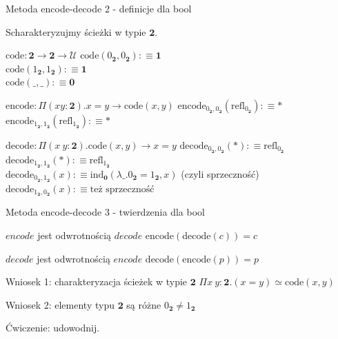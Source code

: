 \documentclass{beamer}
\newcommand{\defn}{:\equiv}
\newcommand{\U}{\mathcal{U}}
\newcommand{\refl}[1]{\text{refl}_{#1}}
\newcommand{\code}{\text{code}}
\newcommand{\encode}{\text{encode}}
\newcommand{\decode}{\text{decode}}
\begin{document}
\begin{frame}{Metoda encode-decode 2 - definicje dla bool}
	
Scharakteryzujmy ścieżki w typie $\textbf{2}$.

\begin{block}{$\code : \textbf{2} \to \textbf{2} \to \U$}
$\code(0_{\textbf{2}}, 0_{\textbf{2}}) \defn \textbf{1}$ \\
$\code(1_{\textbf{2}}, 1_{\textbf{2}}) \defn \textbf{1}$ \\
$\code(\_, \_) \defn \textbf{0}$
\end{block}

\begin{block}{$\encode : \Pi (x y : \textbf{2}). x = y \to \code(x, y)$}
$\encode_{0_{\textbf{2}}, 0_{\textbf{2}}}(\refl{0_{\textbf{2}}}) \defn *$ \\
$\encode_{1_{\textbf{2}}, 1_{\textbf{2}}}(\refl{1_{\textbf{2}}}) \defn *$
\end{block}

\begin{block}{$\decode : \Pi (x\ y : \textbf{2}). \code(x, y) \to x = y$}
$\decode_{0_{\textbf{2}}, 0_{\textbf{2}}}(*) \defn \refl{0_{\textbf{2}}}$ \\
$\decode_{1_{\textbf{2}}, 1_{\textbf{2}}}(*) \defn \refl{1_{\textbf{2}}}$ \\
$\decode_{0_{\textbf{2}}, 1_{\textbf{2}}}(x) \defn \text{ind}_{\textbf{0}}(\lambda \_. 0_{\textbf{2}} = 1_{\textbf{2}}, x)$ (czyli sprzeczność) \\
$\decode_{1_{\textbf{2}}, 0_{\textbf{2}}}(x) \defn \text{też sprzeczność}$
\end{block}

\end{frame}

\begin{frame}{Metoda encode-decode 3 - twierdzenia dla bool}

\begin{block}{$encode$ jest odwrotnością $decode$}
$\encode(\decode(c)) = c$
\end{block}
	
\begin{block}{$decode$ jest odwrotnością $encode$}
$\decode(\encode(p)) = p$
\end{block}

\begin{block}{Wniosek 1: charakteryzacja ścieżek w typie $\textbf{2}$}
$\Pi x\ y : \textbf{2}. (x = y) \simeq \code(x, y)$
\end{block}

\begin{block}{Wniosek 2: elementy typu $\textbf{2}$ są różne}
$0_{\textbf{2}} \neq 1_{\textbf{2}}$
\end{block}

Ćwiczenie: udowodnij.

\end{frame}
\end{document}
